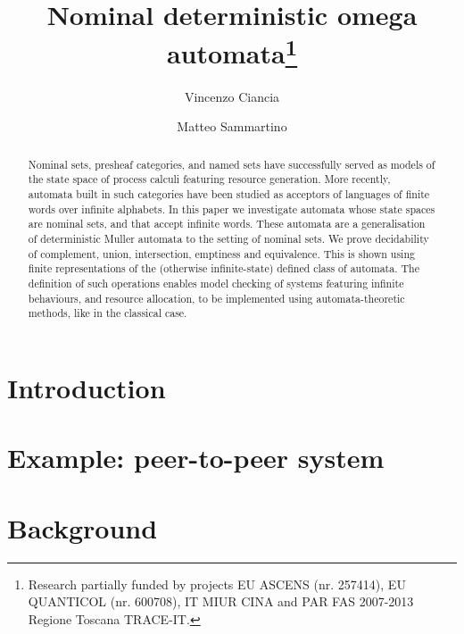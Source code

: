 \documentclass[orivec]{llncs}
\title{Nominal deterministic omega automata\thanks{Research partially funded by projects EU 
ASCENS (nr. 257414), EU QUANTICOL (nr. 600708), 
IT MIUR CINA and PAR FAS 2007-2013 Regione Toscana TRACE-IT.}
}
\author{Vincenzo Ciancia\inst{1} \and Matteo Sammartino\inst{2}}
\institute{ISTI-CNR, Pisa \and Dipartimento di Informatica, Universit\`a di Pisa, Pisa }
\begin{document}
%

\maketitle

\begin{abstract}
 Nominal sets, presheaf categories, and named sets have successfully served as models of the state space of process calculi featuring resource generation. More recently, automata built in such categories have been studied as acceptors of languages of finite words over infinite alphabets. In this paper we investigate automata whose state spaces are nominal sets, and that accept infinite words. These automata are a generalisation of deterministic Muller automata to the setting of nominal sets. 
 We prove decidability of complement, union, intersection, emptiness and equivalence. This is shown using finite representations of the (otherwise infinite-state) defined class of automata. The definition of such operations enables model checking of systems featuring infinite behaviours, and resource allocation, to be implemented using automata-theoretic methods, like in the classical case.
\end{abstract}

\section{Introduction}\label{sec:introduction}

\section{Example: peer-to-peer system}\label{sec:example}


\section{Background}\label{sec:background}
\end{document}
